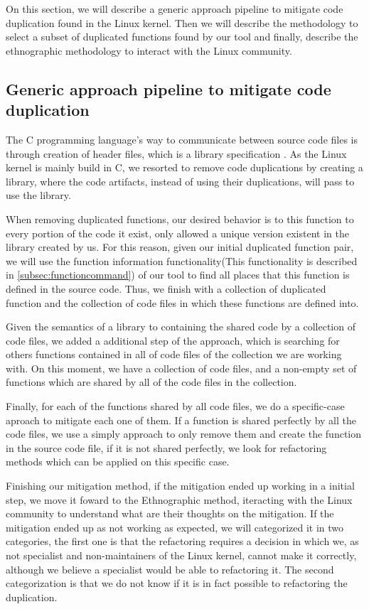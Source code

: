 On this section, we will describe a generic approach pipeline to mitigate code duplication found in the Linux kernel. Then we
will describe the methodology to select a subset of duplicated functions found by our tool and finally, describe the ethnographic
methodology to interact with the Linux community.


\subsection{Generic approach pipeline to mitigate code duplication}

The C programming language's way to communicate between source code files is through creation of header files, which is
a library specification \citep{Cbook}. As the Linux kernel is mainly build in C, we resorted to remove code duplications by
creating a library, where the code artifacts, instead of using their duplications, will pass to use the library.

When removing duplicated functions, our desired behavior is to this function to every portion of the code it exist, only allowed a
unique version existent in the library created by us. For this reason, given our initial duplicated function pair, we will use 
the function information functionality(This functionality is described in \ref{subsec:functioncommand}) of our tool to find all 
places that this function is defined in the source code. Thus, we finish with a collection of duplicated function and the collection
of code files in which these functions are defined into.

Given the semantics of a library to containing the shared code by a collection of code files, we added a additional step of the 
approach, which is searching for others functions contained in all of code files of the collection we are working with. 
On this moment, we have a collection of code files, and a non-empty set of functions which are shared by all of the code files 
in the collection.

Finally, for each of the functions shared by all code files, we do a specific-case aproach to mitigate each one of them.
If a function is shared perfectly by all the code files, we use a simply approach to only remove them and create the function in
the source code file, if it is not shared perfectly, we look for refactoring methods which can be applied on this specific case. 

Finishing our mitigation method, if the mitigation ended up working in a initial step, we move it foward to the 
Ethnographic method, iteracting with the Linux community to understand what are their thoughts on the mitigation. If the mitigation
ended up as not working as expected, we will categorized it in two categories, the first one is that the refactoring requires a
decision in which we, as not specialist and non-maintainers of the Linux kernel, cannot make it correctly, although
we believe a specialist would be able to refactoring it. The second categorization is that we do not know if it is in fact possible
to refactoring the duplication. 

